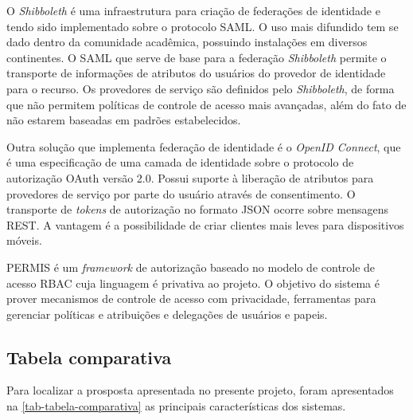 \documentclass{doublecol-new}
\begin{document}
O \textit{Shibboleth} é uma infraestrutura para criação de federações de identidade e tendo sido implementado sobre o protocolo SAML. O uso mais difundido tem se dado dentro da comunidade acadêmica, possuindo instalações em diversos continentes. O SAML que serve de base para a federação \textit{Shibboleth} permite o transporte de informações de atributos do usuários do provedor de identidade para o recurso. Os provedores de serviço são definidos pelo \textit{Shibboleth}, de forma que não permitem políticas de controle de acesso mais avançadas, além do fato de não estarem baseadas em padrões estabelecidos.

Outra solução que implementa federação de identidade é o \textit{OpenID Connect}, que é uma especificação de uma camada de identidade sobre o protocolo de autorização OAuth versão 2.0. Possui suporte à liberação de atributos para provedores de serviço por parte do usuário através de consentimento. O transporte de \textit{tokens} de autorização no formato JSON ocorre sobre mensagens REST. A vantagem é a possibilidade de criar clientes mais leves para dispositivos móveis.

PERMIS \cite{chadwick2008permis} é um \textit{framework} de autorização baseado no modelo de controle de acesso RBAC cuja linguagem é privativa ao projeto. O objetivo do sistema é prover mecanismos de controle de acesso com privacidade, ferramentas para gerenciar políticas e atribuições e delegações de usuários e papeis.



\subsection{Tabela comparativa}

Para localizar a prosposta apresentada no presente projeto, foram apresentados na \ref{tab-tabela-comparativa} as principais características dos sistemas.
\end{document}
